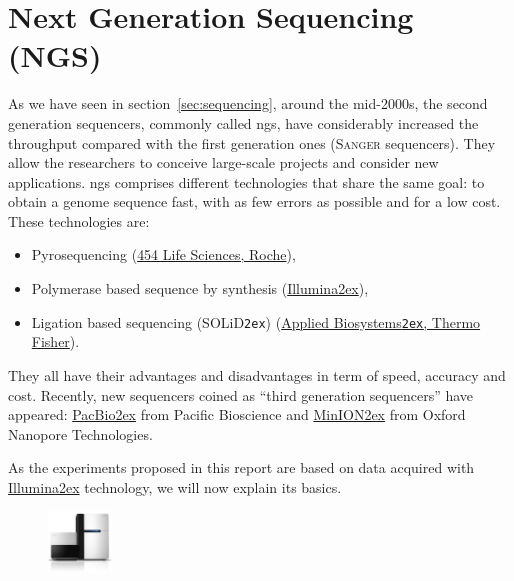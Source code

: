 \section{Next Generation Sequencing (NGS)}
\label{sec:ngs}
As we have seen in section~\ref{sec:sequencing}, around the mid-2000s, the second generation sequencers, commonly called \gls{ngs}, have considerably increased the throughput compared with the first generation ones (\textsc{Sanger} sequencers). They allow the researchers to conceive large-scale projects and consider new applications.
\gls{ngs} comprises different technologies that share the same goal: to obtain a genome sequence fast, with as few errors as possible and for a low cost.
These technologies are:

\begin{itemize}
    \item Pyrosequencing (\href{http://www.454.com/}{454 Life Sciences, Roche}),
    \item Polymerase based sequence by synthesis (\href{http://www.illumina.com/}{Illumina\ttfamily\tiny\raise 2ex\hbox{\textregistered}}),
    \item Ligation based sequencing (SOLiD\texttt{\tiny\raise 2ex\hbox{\texttrademark}}) (\href{http://www.appliedbiosystems.com/absite/us/en/home.html}{Applied Biosystems\texttt{\tiny\raise 2ex\hbox{\texttrademark}}, Thermo Fisher}).
\end{itemize}

They all have their advantages and disadvantages in term of speed, accuracy and cost.
Recently, new sequencers coined as ``third generation sequencers'' have appeared:
\href{http://www.pacificbiosciences.com/}{PacBio\ttfamily\tiny\raise 2ex\hbox{\textregistered}} from Pacific Bioscience and \href{https://nanoporetech.com/products-services/minion-mki}{MinION\ttfamily\tiny\raise 2ex\hbox{\texttrademark}} from Oxford Nanopore Technologies.

As the experiments proposed in this report are based on data acquired with \href{http://www.illumina.com/}{Illumina\ttfamily\tiny\raise 2ex\hbox{\textregistered}} technology, we will now explain its basics.
\pagebreak

\begin{figure}
    \vspace{-1.9em}
    \includegraphics[width=0.15\textwidth]{img/illumina}
\end{figure}

